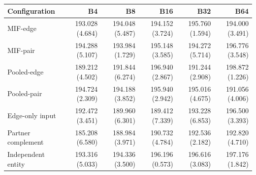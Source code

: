 \begin{tablehere}\scriptsize
\setlength{\tabcolsep}{3pt}
\caption{mamujoco: structural controls, mean episode length. Mean (sample SD) over five training seeds.}

\begin{tabular}{lrrrrr}\toprule
Configuration & B4 & B8 & B16 & B32 & B64 \\\midrule
MIF-edge & 193.028 (4.684) & 194.048 (5.487) & 194.152 (3.724) & 195.760 (1.594) & 194.000 (3.491) \\
MIF-pair & 194.288 (5.107) & 193.984 (1.729) & 195.148 (3.585) & 194.272 (5.714) & 196.776 (3.548) \\
Pooled-edge & 189.212 (4.502) & 191.844 (6.274) & 196.940 (2.867) & 191.244 (2.908) & 198.872 (1.226) \\
Pooled-pair & 194.724 (2.309) & 194.188 (3.852) & 195.940 (2.942) & 195.016 (4.675) & 191.056 (4.006) \\
Edge-only input & 192.472 (3.451) & 189.960 (6.301) & 189.412 (7.339) & 193.228 (6.853) & 196.500 (3.393) \\
Partner complement & 185.208 (6.580) & 188.984 (3.971) & 190.732 (4.784) & 192.536 (2.182) & 192.820 (4.710) \\
Independent entity & 193.316 (5.033) & 194.336 (3.500) & 196.196 (0.573) & 196.616 (3.083) & 197.176 (1.842) \\
\bottomrule\end{tabular}
\end{tablehere}

